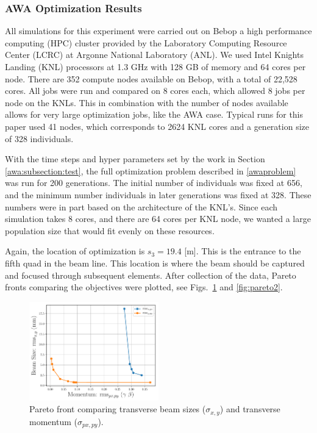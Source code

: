 \subsubsection{AWA Optimization Results}
All simulations for this experiment were carried out on Bebop a
high performance computing (HPC)
cluster provided by the Laboratory Computing Resource Center (LCRC)
at Argonne National Laboratory (ANL). We used Intel Knights Landing 
(KNL) processors at 1.3 GHz with 128 GB of memory 
and 64 cores per node. There are 352 compute nodes available on 
Bebop, with a total of 22,528 cores. All jobs were run and compared 
on 8 cores each, which allowed 8 jobs per node on the KNLs.
This in combination with the number of nodes available 
allows for very large optimization jobs, like the AWA case.
Typical runs for this paper used 41 nodes, which corresponds to 2624 KNL cores 
and a generation size of 328 individuals.


With the time steps and hyper parameters set by the work in Section \ref{awa:subsection:test}, 
the full optimization problem described in \ref{awaproblem} was run for 200 generations.
The initial number of individuals was fixed at 656, 
and the minimum number individuals in later generations was fixed at 328. 
These numbers were in part based on the architecture of the KNL's. 
Since each simulation takes 8 cores, and there are 64 cores per KNL node, 
we wanted a large population size that would fit evenly on these resources. 

Again, the location of optimization is $s_3=19.4$ [m]. 
This is the entrance to the fifth quad in the beam line. 
This location is where the beam should be captured and focused through subsequent elements.
After collection of the data, Pareto fronts comparing the objectives were plotted, 
see Figs.~\ref{fig:pareto1} and \ref{fig:pareto2}.

\begin{figure}
	\includegraphics[width=0.5\textwidth]{../pareto_stat_plots/xy_vs_pxy_pareto_front_quads_before_Q5}
	\caption{Pareto front comparing transverse beam sizes ($\sigma_{x,y}$) and transverse momentum ($\sigma_{px,py}$).}
	\label{fig:pareto1}
\end{figure}

